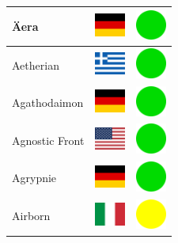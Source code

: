 \documentclass[12pt, a4paper, twoside]{report}
\begin{document}
\begin{center}
\begin{longtable}{|p{5cm}|p{2cm}|p{2cm}|}
 Äera                                                       & \includegraphics[width=1cm]{../4x3/de} &   \includegraphics[width=1cm]{../likes/y} \\ \hline
 Aetherian                                                  & \includegraphics[width=1cm]{../4x3/gr} &   \includegraphics[width=1cm]{../likes/y} \\ \hline
 Agathodaimon                                               & \includegraphics[width=1cm]{../4x3/de} &   \includegraphics[width=1cm]{../likes/y} \\ \hline
 Agnostic Front                                             & \includegraphics[width=1cm]{../4x3/us} &   \includegraphics[width=1cm]{../likes/y} \\ \hline
 Agrypnie                                                   & \includegraphics[width=1cm]{../4x3/de} &   \includegraphics[width=1cm]{../likes/y} \\ \hline
 Airborn                                                    & \includegraphics[width=1cm]{../4x3/it} &   \includegraphics[width=1cm]{../likes/m} \\ \hline

\end{longtable}
\end{center}
\end{document}
